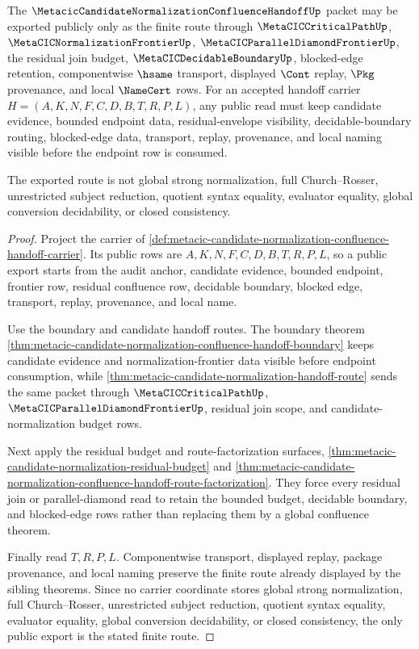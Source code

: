 \begin{theorem}
\label{thm:metacic-candidate-normalization-confluence-handoff-public-export}
The $\MetacicCandidateNormalizationConfluenceHandoffUp$ packet may be exported publicly only as the finite route through $\MetaCICCriticalPathUp$, $\MetaCICNormalizationFrontierUp$, $\MetaCICParallelDiamondFrontierUp$, the residual join budget, $\MetaCICDecidableBoundaryUp$, blocked-edge retention, componentwise $\hsame$ transport, displayed $\Cont$ replay, $\Pkg$ provenance, and local $\NameCert$ rows. For an accepted handoff carrier $H=(A,K,N,F,C,D,B,T,R,P,L)$, any public read must keep candidate evidence, bounded endpoint data, residual-envelope visibility, decidable-boundary routing, blocked-edge data, transport, replay, provenance, and local naming visible before the endpoint row is consumed.

The exported route is not global strong normalization, full Church--Rosser, unrestricted subject reduction, quotient syntax equality, evaluator equality, global conversion decidability, or closed consistency.
\end{theorem}
\begin{proof}
Project the carrier of \autoref{def:metacic-candidate-normalization-confluence-handoff-carrier}. Its public rows are $A,K,N,F,C,D,B,T,R,P,L$, so a public export starts from the audit anchor, candidate evidence, bounded endpoint, frontier row, residual confluence row, decidable boundary, blocked edge, transport, replay, provenance, and local name.

Use the boundary and candidate handoff routes. The boundary theorem \autoref{thm:metacic-candidate-normalization-confluence-handoff-boundary} keeps candidate evidence and normalization-frontier data visible before endpoint consumption, while \autoref{thm:metacic-candidate-normalization-handoff-route} sends the same packet through $\MetaCICCriticalPathUp$, $\MetaCICParallelDiamondFrontierUp$, residual join scope, and candidate-normalization budget rows.

Next apply the residual budget and route-factorization surfaces, \autoref{thm:metacic-candidate-normalization-residual-budget} and \autoref{thm:metacic-candidate-normalization-confluence-handoff-route-factorization}. They force every residual join or parallel-diamond read to retain the bounded budget, decidable boundary, and blocked-edge rows rather than replacing them by a global confluence theorem.

Finally read $T,R,P,L$. Componentwise transport, displayed replay, package provenance, and local naming preserve the finite route already displayed by the sibling theorems. Since no carrier coordinate stores global strong normalization, full Church--Rosser, unrestricted subject reduction, quotient syntax equality, evaluator equality, global conversion decidability, or closed consistency, the only public export is the stated finite route.
\end{proof}
